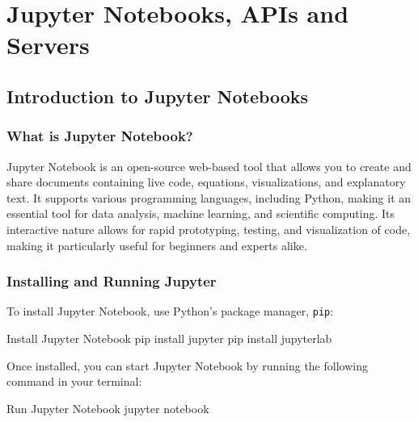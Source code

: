 \chapter{Jupyter Notebooks, APIs and Servers}

%
\section{Introduction to Jupyter Notebooks}

%
\subsection{What is Jupyter Notebook?}


Jupyter Notebook is an open-source web-based tool that allows you to create and share documents containing live code, equations, visualizations, and explanatory text. It supports various programming languages, including Python, making it an essential tool for data analysis, machine learning, and scientific computing. Its interactive nature allows for rapid prototyping, testing, and visualization of code, making it particularly useful for beginners and experts alike.

%
\subsection{Installing and Running Jupyter}

To install Jupyter Notebook, use Python’s package manager, \texttt{pip}:

\begin{codeonly}{Install Jupyter Notebook}
pip install jupyter
pip install jupyterlab
\end{codeonly}

Once installed, you can start Jupyter Notebook by running the following command in your terminal:

\begin{codeonly}{Run Jupyter Notebook}
jupyter notebook
\end{codeonly}

